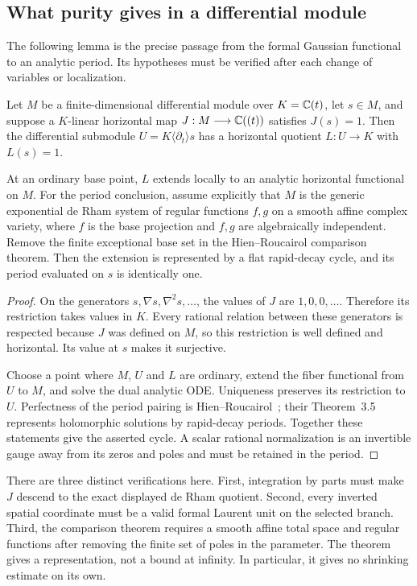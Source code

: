 \subsection{What purity gives in a differential module}\label{sec:seedbridge}

The following lemma is the precise passage from the formal Gaussian
functional to an analytic period. Its hypotheses must be verified
after each change of variables or localization.

\begin{lemma}\label{lem:seedfunctional}
Let $M$ be a finite-dimensional differential module over $K=\mathbb C(t)$,
let $s\in M$, and suppose a $K$-linear horizontal map
$J:M\longrightarrow\mathbb C((t))$ satisfies $J(s)=1$. Then the differential
submodule $U=K\langle\partial_t\rangle s$ has a horizontal quotient
$L:U\longrightarrow K$ with $L(s)=1$.

At an ordinary base point, $L$ extends locally to an analytic horizontal
functional on $M$. For the period conclusion, assume explicitly that
$M$ is the generic exponential de Rham system of regular functions
$f,g$ on a smooth affine complex variety, where $f$ is the base
projection and $f,g$ are algebraically independent. Remove the finite
exceptional base set in the Hien--Roucairol comparison theorem.
Then the extension is represented by a flat rapid-decay cycle, and its
period evaluated on $s$ is identically one.
\end{lemma}
\begin{proof}
On the generators $s,\nabla s,\nabla^2s,\ldots$, the values of $J$
are $1,0,0,\ldots$. Therefore its restriction takes values in $K$.
Every rational relation between these generators is respected because
$J$ was defined on $M$, so this restriction is well defined and
horizontal. Its value at $s$ makes it surjective.

Choose a point where $M$, $U$ and $L$ are ordinary, extend the fiber
functional from $U$ to $M$, and solve the dual analytic ODE.
Uniqueness preserves its restriction to $U$. Perfectness of the period pairing is
Hien--Roucairol~\cite[Theorem~2.7]{HienRoucairol}; their
Theorem~3.5 represents holomorphic solutions by rapid-decay periods.
Together these statements give the asserted cycle. A scalar rational normalization is an invertible gauge
away from its zeros and poles and must be retained in the period.
\end{proof}

There are three distinct verifications here. First, integration by
parts must make $J$ descend to the exact displayed de Rham quotient.
Second, every inverted spatial coordinate must be a valid formal
Laurent unit on the selected branch. Third, the comparison theorem
requires a smooth affine total space and regular functions after
removing the finite set of poles in the parameter. The theorem gives
a representation, not a bound at infinity. In particular, it gives
no shrinking estimate on its own.


